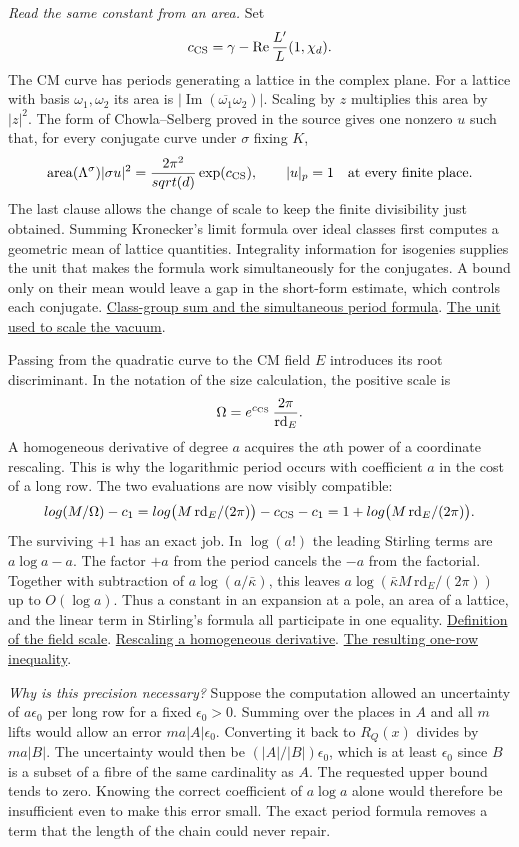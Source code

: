 \documentclass[11pt,letterpaper]{article}
\newcommand{\sref}[2]{\href{https://github.com/VladimirReshetnikov/ProveIt/blob/d8415e76ad850651f8c0083afe689dd9f4a45a10/Analysis/GeneralizedRiemannHypothesis/vendor/grh-lean/grh/src/#1.lean}{#2}}
\renewcommand{\Re}{\operatorname{Re}}
\renewcommand{\Im}{\operatorname{Im}}
\begin{document}
\emph{Read the same constant from an area.} Set
\[
           c_{\rm CS}=\gamma-\Re\frac{L'}{L}(1,\chi_d).
\]
The CM curve has periods generating a lattice in the complex plane. For a lattice with basis \(\omega_1,\omega_2\) its area is \(|\Im(\overline{\omega_1}\omega_2)|\). Scaling by \(z\) multiplies this area by \(|z|^2\). The form of Chowla--Selberg proved in the source gives one nonzero \(u\) such that, for every conjugate curve under \(\sigma\) fixing \(K\),
\[
        \operatorname{area}(\Lambda^\sigma)|\sigma u|^2
                  =\frac{2\pi^2}{\sqrt d}\exp(c_{\rm CS}),
        \qquad |u|_p=1\quad\text{at every finite place.}
\]
The last clause allows the change of scale to keep the finite divisibility just obtained. Summing Kronecker's limit formula over ideal classes first computes a geometric mean of lattice quantities. Integrality information for isogenies supplies the unit that makes the formula work simultaneously for the conjugates. A bound only on their mean would leave a gap in the short-form estimate, which controls each conjugate. \sref{Lib/CM/ChowlaSelberg}{Class-group sum and the simultaneous period formula}. \sref{New/Derivatives/Vacuum/TightFrames}{The unit used to scale the vacuum}.

Passing from the quadratic curve to the CM field \(E\) introduces its root discriminant. In the notation of the size calculation, the positive scale is
\[
   \Omega=e^{c_{\rm CS}}\,\frac{2\pi}{\mathrm{rd}_E}.
\]
A homogeneous derivative of degree \(a\) acquires the \(a\)th power of a coordinate rescaling. This is why the logarithmic period occurs with coefficient \(a\) in the cost of a long row. The two evaluations are now visibly compatible:
\[
 \log(M/\Omega)-c_1
       =\log\bigl(M\,\mathrm{rd}_E/(2\pi)\bigr)-c_{\rm CS}-c_1
       =1+\log\bigl(M\,\mathrm{rd}_E/(2\pi)\bigr).
\]
The surviving \(+1\) has an exact job. In \(\log(a!)\) the leading Stirling terms are \(a\log a-a\). The factor \(+a\) from the period cancels the \(-a\) from the factorial. Together with subtraction of \(a\log(a/\bar\kappa)\), this leaves \(a\log(\bar\kappa M\,\mathrm{rd}_E/(2\pi))\) up to \(O(\log a)\). Thus a constant in an expansion at a pole, an area of a lattice, and the linear term in Stirling's formula all participate in one equality. \sref{New/Reduction/Data/FieldsAndPlaces}{Definition of the field scale}. \sref{New/Derivatives/Vacuum/Scale}{Rescaling a homogeneous derivative}. \sref{New/UpperBound/Size/ArchimedeanSize}{The resulting one-row inequality}.

\emph{Why is this precision necessary?} Suppose the computation allowed an uncertainty of \(a\epsilon_0\) per long row for a fixed \(\epsilon_0>0\). Summing over the places in \(A\) and all \(m\) lifts would allow an error \(ma|A|\epsilon_0\). Converting it back to \(R_Q(x)\) divides by \(ma|B|\). The uncertainty would then be \((|A|/|B|)\epsilon_0\), which is at least \(\epsilon_0\) since \(B\) is a subset of a fibre of the same cardinality as \(A\). The requested upper bound tends to zero. Knowing the correct coefficient of \(a\log a\) alone would therefore be insufficient even to make this error small. The exact period formula removes a term that the length of the chain could never repair.
\end{document}
